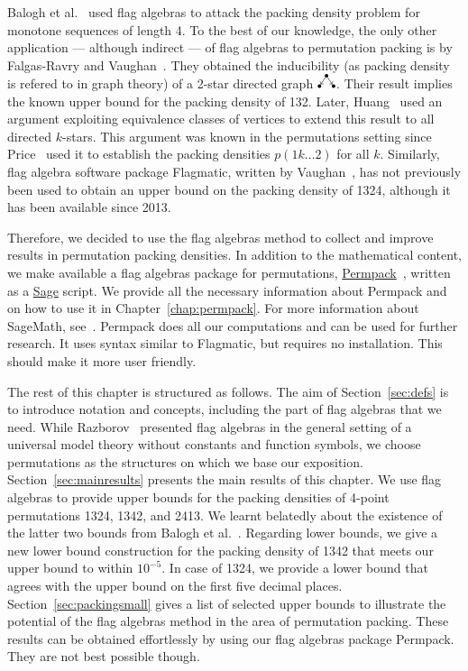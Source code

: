 \documentclass[12pt, a4paper, twoside]{report}
\begin{document}
Balogh et al.~\cite{balogh2015minimum} used flag algebras to attack the packing density problem for monotone sequences of length 4. To the best of our knowledge, the only other application --- although indirect --- of flag algebras to permutation packing is by Falgas-Ravry and Vaughan~\cite{falgas2013applications}. They obtained the inducibility (as packing density is refered to in graph theory) of a 2-star directed graph $\outstar$. Their result implies the known upper bound for the packing density of 132. Later, Huang~\cite{huang2014stars} used an argument exploiting equivalence classes of vertices to extend this result to all directed $k$-stars. This argument was known in the permutations setting since Price~\cite{price1997packing} used it to establish the packing densities $p(1k\ldots 2)$ for all $k$. Similarly, flag algebra software package Flagmatic, written by Vaughan~\cite{flagmatic}, has not previously been used to obtain an upper bound on the packing density of 1324, although it has been available since 2013.

Therefore, we decided to use the flag algebras method to collect and improve results in permutation packing densities. In addition to the mathematical content, we make available a flag algebras package for permutations, \href{http://jsliacan.github.io/permpack/}{Permpack}~\cite{permpack}, written as a \href{http://sagemath.org}{Sage} script. We provide all the necessary information about Permpack and on how to use it in Chapter~\ref{chap:permpack}. For more information about SageMath, see~\cite{sagemath}. Permpack does all our computations and can be used for further research. It uses syntax similar to Flagmatic, but requires no installation. This should make it more user friendly.

The rest of this chapter is structured as follows. The aim of Section~\ref{sec:defs} is to introduce notation and concepts, including the part of flag algebras that we need. While Razborov~\cite{razborov2007original} presented flag algebras in the general setting of a universal model theory without constants and function symbols, we choose permutations as the structures on which we base our exposition. Section~\ref{sec:mainresults} presents the main results of this chapter. We use flag algebras to provide upper bounds for the packing densities of 4-point permutations 1324, 1342, and 2413. We learnt belatedly about the existence of the latter two bounds from Balogh et al.~\cite{balogh2015minimum}. Regarding lower bounds, we give a new lower bound construction for the packing density of 1342 that meets our upper bound to within $10^{-5}$. In case of 1324, we provide a lower bound that agrees with the upper bound on the first five decimal places. Section~\ref{sec:packingsmall} gives a list of selected upper bounds to illustrate the potential of the flag algebras method in the area of permutation packing. These results can be obtained effortlessly by using our flag algebras package Permpack. They are not best possible though.
\end{document}

